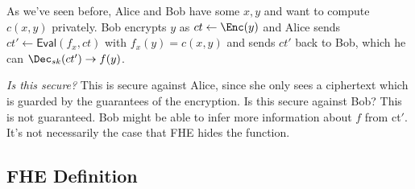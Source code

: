 \begin{example}[Secure 2PC]
    As we've seen before, Alice and Bob have some $x, y$ and want to compute $c(x,y)$ privately. Bob encrypts $y$ as $ct\leftarrow \Enc(y)$ and Alice sends $ct' \leftarrow \mathsf{Eval}(f_x, ct)$ with $f_x(y) = c(x,y)$ and sends $ct'$ back to Bob, which he can $\Dec_{sk}(ct')\to f(y)$.

    \emph{Is this secure?} This is secure against Alice, since she only sees a ciphertext which is guarded by the guarantees of the encryption. Is this secure against Bob? This is not guaranteed. Bob might be able to infer more information about $f$ from ct$'$. It's not necessarily the case that FHE hides the function.
\end{example}

\subsection{FHE Definition}

